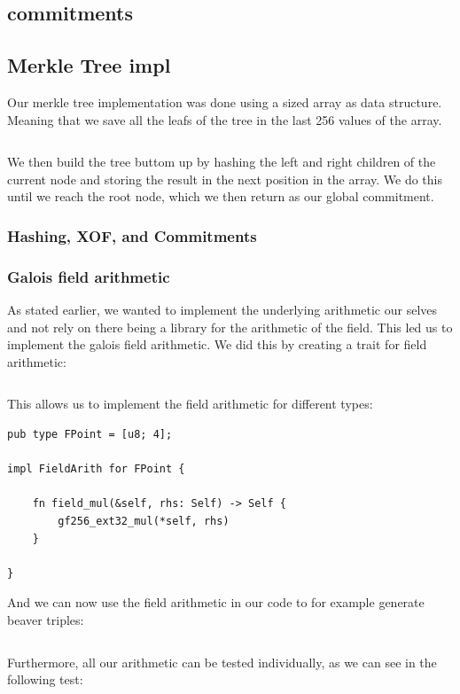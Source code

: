 \documentclass[twoside,11pt]{report}
\theoremstyle{definition}
\theoremstyle{plain}
\begin{document}
%
\subsection{commitments}

\subsection{Merkle Tree impl}\label{sub:merkle_tree_impl}
Our merkle tree implementation was done using a sized array as data structure. Meaning that we save all the leafs of the tree in the last 256 values of the array.
\inputminted[firstline=18, lastline=23]{rust}{../sdith/src/subroutines/merkle_tree.rs}
We then build the tree buttom up by hashing the left and right children of the current node and storing the result in the next position in the array. We do this until we reach the root node, which we then return as our global commitment.


\subsubsection{Hashing, XOF, and Commitments}

\subsubsection{Galois field arithmetic}\label{sub:gf256_arith}
As stated earlier, we wanted to implement the underlying arithmetic our selves and not rely on there being a library for the arithmetic of the field. This led us to implement the galois field arithmetic.
We did this by creating a trait for field arithmetic:
\inputminted[firstline=10, lastline=66]{rust}{../sdith/src/arith/gf256/mod.rs}
This allows us to implement the field arithmetic for different types:
\begin{verbatim}
pub type FPoint = [u8; 4];

impl FieldArith for FPoint {

    fn field_mul(&self, rhs: Self) -> Self {
        gf256_ext32_mul(*self, rhs)
    }

}
\end{verbatim}
And we can now use the field arithmetic in our code to for example generate beaver triples:
\inputminted[firstline=152, lastline=152]{rust}{../sdith/src/mpc/beaver.rs}

Furthermore, all our arithmetic can be tested individually, as we can see in the following test:
\inputminted[firstline=68, lastline=96]{rust}{../sdith/src/arith/gf256/mod.rs}
\end{document}
